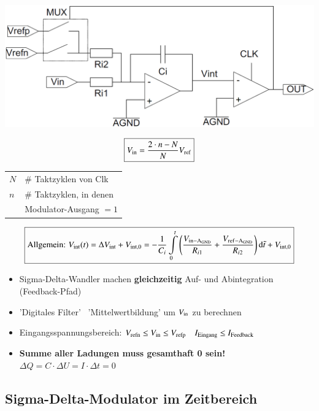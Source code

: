 \begin{minipage}[c]{0.48\columnwidth}
    \includegraphics[width=\columnwidth]{images/sigma-delta-wandler.png}
\end{minipage}
\hfill
\begin{minipage}[c]{0.48\columnwidth}
    $$ \boxed{V_{\rm in} = \frac{2 \cdot n  - N}{N} V_{\rm ref}} $$

    \begin{tabular}{ll}
        $N$ & \# Taktzyklen von Clk \\
        $n$ & \# Taktzyklen, in denen \\
            & Modulator-Ausgang $=1$
    \end{tabular}
\end{minipage}
$$\boxed{\text{Allgemein: } V_{\rm int}(t) = \Delta V_{\rm int} + V_{\rm int,0} 
    = - \frac{1}{C_i} \int\limits_0^{t} \Bigg( \frac{V_{\rm in - A_{ \rm GND}}}{R_{i1}} + \frac{V_{\rm ref - A_{ \rm GND}}}{R_{i2}} \Bigg) \mathop{} \! \mathrm{d} \tilde{t} + V_{\rm int,0} }$$

\begin{itemize}
    \item Sigma-Delta-Wandler machen \textbf{gleichzeitig} Auf- und Abintegration (Feedback-Pfad)
    \item 'Digitales Filter' \textrightarrow\ 'Mittelwertbildung' um $V_{\rm in}$  zu berechnen
    \item Eingangsspannungsbereich: $V_{\rm refn} \leq V_{\rm in} \leq V_{\rm refp}$ \textrightarrow\ $I_{\rm Eingang} \leq I_{\rm Feedback}$
    \item \textbf{Summe aller Ladungen muss gesamthaft 0 sein!} \textrightarrow\ $\Delta Q = C \cdot \Delta U = I \cdot \Delta t = 0$
\end{itemize}


\subsection{Sigma-Delta-Modulator im Zeitbereich}

